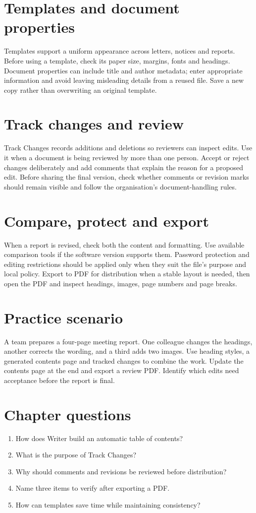 \documentclass[11pt,openany,oneside]{book}
\begin{document}
\section{Templates and document properties}
Templates support a uniform appearance across letters, notices and reports. Before using a template, check its paper size, margins, fonts and headings. Document properties can include title and author metadata; enter appropriate information and avoid leaving misleading details from a reused file. Save a new copy rather than overwriting an original template.
\section{Track changes and review}
Track Changes records additions and deletions so reviewers can inspect edits. Use it when a document is being reviewed by more than one person. Accept or reject changes deliberately and add comments that explain the reason for a proposed edit. Before sharing the final version, check whether comments or revision marks should remain visible and follow the organisation's document-handling rules.
\section{Compare, protect and export}
When a report is revised, check both the content and formatting. Use available comparison tools if the software version supports them. Password protection and editing restrictions should be applied only when they suit the file's purpose and local policy. Export to PDF for distribution when a stable layout is needed, then open the PDF and inspect headings, images, page numbers and page breaks.
\section{Practice scenario}
A team prepares a four-page meeting report. One colleague changes the headings, another corrects the wording, and a third adds two images. Use heading styles, a generated contents page and tracked changes to combine the work. Update the contents page at the end and export a review PDF. Identify which edits need acceptance before the report is final.
\section{Chapter questions}
\begin{enumerate}\item How does Writer build an automatic table of contents?\item What is the purpose of Track Changes?\item Why should comments and revisions be reviewed before distribution?\item Name three items to verify after exporting a PDF.\item How can templates save time while maintaining consistency?\end{enumerate}
\end{document}
